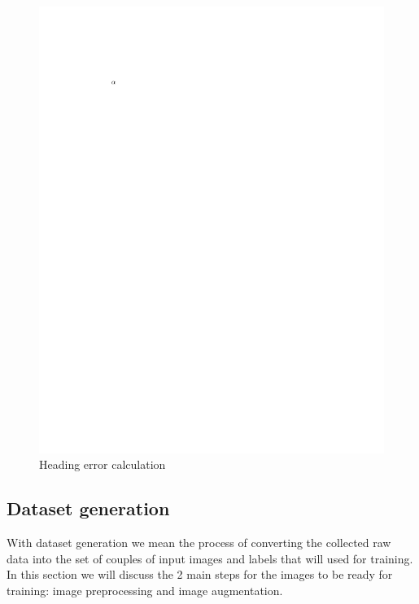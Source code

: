 \documentclass[a4paper,12pt,sort&compress]{article}
\begin{document}
    \begin{figure}
        \centering
        \includegraphics[width=0.6\linewidth]{a.pdf}
        \caption{Heading error calculation}
        \label{fig:heading_error_calculation}
    \end{figure}

\clearpage

\subsection{Dataset generation}
    With dataset generation we mean the process of converting the collected raw data into
    the set of couples of input images and labels that will used for training. In this section we
    will discuss the 2 main steps for the images to be ready for training: image preprocessing and
    image augmentation. 
\end{document}
